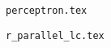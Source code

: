 \documentclass{article}
\begin{document}
\begin{figure}
  \centering
  
  \caption{\texttt{perceptron.tex}}
\end{figure}

\begin{figure}
  \centering
  
  \caption{\texttt{r\_parallel\_lc.tex}}
\end{figure}
\end{document}
